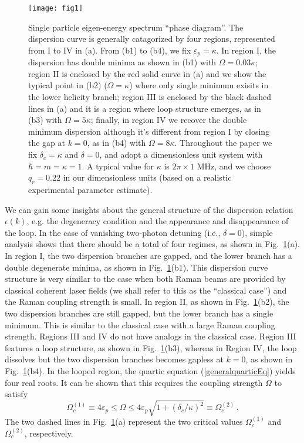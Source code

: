 \documentclass[atoms,article,submit,moreauthors,pdftex,12pt,a4paper]{mdpi}
\begin{document}
\begin{figure}[htp]
\texttt{[image: fig1]}\caption{Single particle eigen-energy spectrum ``phase diagram''.  The dispersion curve is generally catagorized by four regions, represented from I to IV in (a). From (b1) to (b4), we fix $\varepsilon_p=\kappa$. In region I, the dispersion has double minima as shown in (b1) with $\Omega=0.03\kappa$; region II is enclosed by the red solid curve in (a) and we show the typical point in (b2) ($\Omega=\kappa$) where only single minimum exisits in the lower helicity branch; region III is enclosed by the black dashed lines in (a) and it is a region where loop structure emerges, as in (b3) with $\Omega=5\kappa$; finally, in region IV we recover the double minimum dispersion although it's different from region I by closing the gap at $k=0$, as in (b4) with $\Omega=8\kappa$. Throughout the paper we fix $\delta_c=\kappa$ and $\delta=0$, and adopt a dimensionless unit system with $\hbar=m=\kappa=1$. A typical value for $\kappa$ is $2\pi \times 1 \text{ MHz}$, and we choose $q_r = 0.22$ in our dimensionless units (based on a realistic experimental parameter estimate). }\label{fig1}
\end{figure}

We can gain some insights about the general structure of the dispersion relation $\epsilon(k)$, e.g. the degeneracy condition and the appearance and disappearance of the loop. In the case of vanishing two-photon detuning (i.e., $\delta=0$),
simple analysis shows that there should be a total of four regimes, as shown in Fig.~\ref{fig1}(a). In region I, the two dispersion branches are gapped, and the lower branch has a double degenerate minima, as shown in Fig.~\ref{fig1}(b1). This dispersion curve structure is very similar to the case when both Raman beams are provided by classical coherent laser fields (we shall refer to this as the ``classical case'') and the Raman coupling strength is small. In region II, as shown in Fig.~\ref{fig1}(b2), the two dispersion branches are still gapped, but the lower branch has a single minimum. This is similar to the classical case with a large Raman coupling strength. Regions III and IV do not have analogs in the classical case. Region III features a loop structure, as shown in Fig.~\ref{fig1}(b3), whereas in Region IV, the loop dissolves but the two dispersion branches becomes gapless at $k=0$, as shown in Fig.~\ref{fig1}(b4). In the looped region, the quartic equation (\ref{generalquarticEq}) yields four real roots. It can be shown \cite{cavitySOC} that this requires the coupling strength $\Omega$ to satisfy
\[\Omega_c^{(1)}\equiv4\varepsilon_p\leq \Omega \leq  4\varepsilon_p \sqrt{1+(\delta_c/\kappa)^2}\equiv\Omega_c^{(2)} \,.\]
The two dashed lines in Fig.~\ref{fig1}(a) represent the two critical values $\Omega_c^{(1)}$ and $\Omega_c^{(2)}$, respectively.
\end{document}
